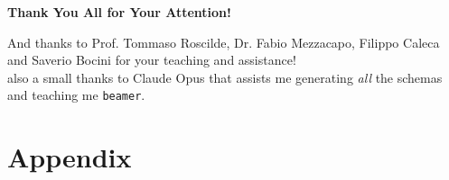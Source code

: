 \documentclass[aspectratio=169, 11pt]{beamer}
\begin{document}
\begin{frame}
    \begin{center}
        \Huge \textbf{Thank You All for Your Attention!}
        
        \vspace{1cm}
        
        \Large And thanks to Prof. Tommaso Roscilde, Dr. Fabio Mezzacapo, Filippo Caleca and Saverio Bocini for your teaching and assistance!
        \\
        \vspace{1cm}
        \small also a small thanks to Claude Opus that assists me generating \textit{all} the schemas and teaching me \texttt{beamer}.
    \end{center}
\end{frame}

\appendix
\section*{Appendix}

\end{document}
